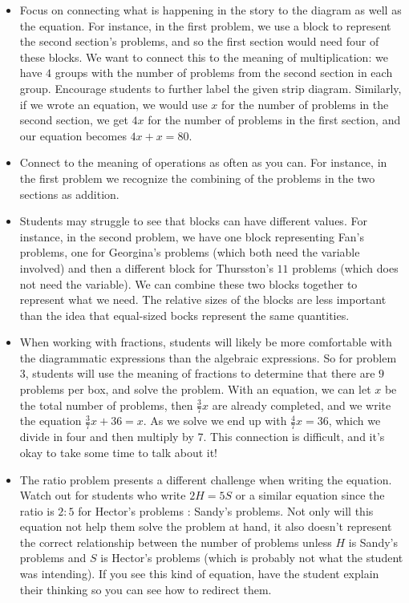 \documentclass[nooutcomes,noauthor]{ximera}
\begin{document}
\begin{instructorNotes}
\begin{itemize}
	\item Focus on connecting what is happening in the story to the diagram as well as the equation. For instance, in the first problem, we use a block to represent the second section's problems, and so the first section would need four of these blocks. We want to connect this to the meaning of multiplication: we have $4$ groups with the number of problems from the second section in each group. Encourage students to further label the given strip diagram. Similarly, if we wrote an equation, we would use $x$ for the number of problems in the second section, we get $4x$ for the number of problems in the first section, and our equation becomes $4x + x = 80$.
	\item Connect to the meaning of operations as often as you can. For instance, in the first problem we recognize the combining of the problems in the two sections as addition.
	\item Students may struggle to see that blocks can have different values. For instance, in the second problem, we have one block representing Fan's problems, one for Georgina's problems (which both need the variable involved) and then a different block for Thursston's $11$ problems (which does not need the variable). We can combine these two blocks together to represent what we need. The relative sizes of the blocks are less important than the idea that equal-sized bocks represent the same quantities.
	\item When working with fractions, students will likely be more comfortable with the diagrammatic expressions than the algebraic expressions. So for problem 3, students will use the meaning of fractions to determine that there are $9$ problems per box, and solve the problem. With an equation, we can let $x$ be the total number of problems, then $\frac37 x$ are already completed, and we write the equation $\frac37 x + 36 = x$. As we solve we end up with $\frac47 x = 36$, which we divide in four and then multiply by 7. This connection is difficult, and it's okay to take some time to talk about it!
	\item The ratio problem presents a different challenge when writing the equation. Watch out for students who write $2H = 5S$ or a similar equation since the ratio is $2:5$ for Hector's problems : Sandy's problems. Not only will this equation not help them solve the problem at hand, it also doesn't represent the correct relationship between the number of problems unless $H$ is Sandy's problems and $S$ is Hector's problems (which is probably not what the student was intending). If you see this kind of equation, have the student explain their thinking so you can see how to redirect them.
\end{itemize}



\end{instructorNotes}
\end{document}
